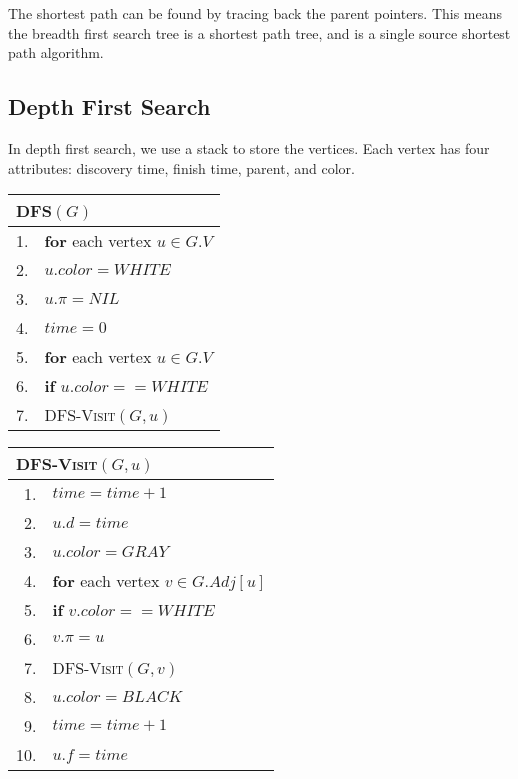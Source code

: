 \documentclass[a4paper,12pt]{article}
\begin{document}
\vspace{1cm}
The shortest path can be found by tracing back the parent pointers.
This means the breadth first search tree is a shortest path tree, and is a single source shortest path algorithm.

\subsection{Depth First Search}

In depth first search, we use a stack to store the vertices.
Each vertex has four attributes: discovery time, finish time, parent, and color.

\begin{center}
	\begin{tabular}{rl}
		\toprule
		\multicolumn{2}{l}{\textsc{DFS}$(G)$} \\
		\midrule
		1. & \textbf{for} each vertex $u \in G.V$ \\
		2. & \quad $u.color = WHITE$ \\
		3. & \quad $u.\pi = NIL$ \\
		4. & $time = 0$ \\
		5. & \textbf{for} each vertex $u \in G.V$ \\
		6. & \quad \textbf{if} $u.color == WHITE$ \\
		7. & \quad \quad \textsc{DFS-Visit}$(G, u)$ \\
		\bottomrule
	\end{tabular}
\end{center}

\begin{center}
	\begin{tabular}{rl}
		\toprule
		\multicolumn{2}{l}{\textsc{DFS-Visit}$(G, u)$} \\
		\midrule
		1. & $time = time + 1$ \\
		2. & $u.d = time$ \\
		3. & $u.color = GRAY$ \\
		4. & \textbf{for} each vertex $v \in G.Adj[u]$ \\
		5. & \quad \textbf{if} $v.color == WHITE$ \\
		6. & \quad \quad $v.\pi = u$ \\
		7. & \quad \quad \textsc{DFS-Visit}$(G, v)$ \\
		8. & $u.color = BLACK$ \\
		9. & $time = time + 1$ \\
		10. & $u.f = time$ \\
		\bottomrule
	\end{tabular}
\end{center}
\end{document}
